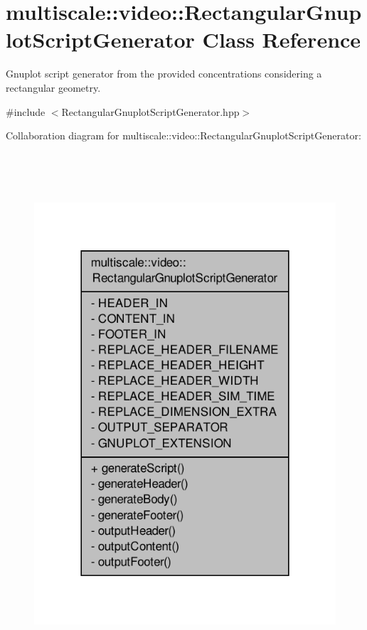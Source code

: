 \hypertarget{classmultiscale_1_1video_1_1RectangularGnuplotScriptGenerator}{\section{multiscale\-:\-:video\-:\-:\-Rectangular\-Gnuplot\-Script\-Generator \-Class \-Reference}
\label{classmultiscale_1_1video_1_1RectangularGnuplotScriptGenerator}
}


\-Gnuplot script generator from the provided concentrations considering a rectangular geometry.  




{\ttfamily \#include $<$\-Rectangular\-Gnuplot\-Script\-Generator.\-hpp$>$}



\-Collaboration diagram for multiscale\-:\-:video\-:\-:\-Rectangular\-Gnuplot\-Script\-Generator\-:
\nopagebreak
\begin{figure}[H]
\begin{center}
\leavevmode
\includegraphics[height=550pt]{classmultiscale_1_1video_1_1RectangularGnuplotScriptGenerator__coll__graph}
\end{center}
\end{figure}
